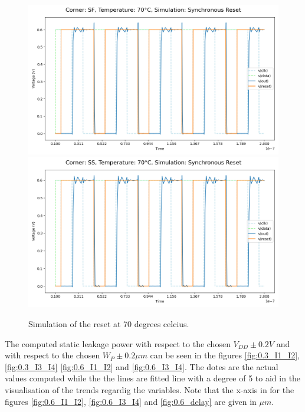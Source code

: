 \begin{figure}[H]
    \vspace{5pt}
    \includegraphics[height= 0.21\textheight]{figures/aimspice/0.600_0.1u_0.1u_0.3u_0.1u/functionality/SF70W3.png}
    \vspace{5pt}
    \includegraphics[height= 0.21\textheight]{figures/aimspice/0.600_0.1u_0.1u_0.3u_0.1u/functionality/SS70W3.png}
    \caption{Simulation of the reset at 70 degrees celcius.}
    \label{fig:aimspice_W3_70}
\end{figure}

The computed static leakage power with respect to the chosen $V_{DD}\pm 0.2V$ and with respect to the chosen $W_P\pm 0.2\mu m$ can be seen in the figures \ref{fig:0.3_I1_I2}, \ref{fig:0.3_I3_I4} \ref{fig:0.6_I1_I2} and \ref{fig:0.6_I3_I4}. The dotes are the actual values computed while the the lines are fitted line with a degree of 5 to aid in the visualisation of the trends regardig the variables. Note that the x-axis in for the figures \ref{fig:0.6_I1_I2}, \ref{fig:0.6_I3_I4} and \ref{fig:0.6_delay} are given in $\mu m$.

